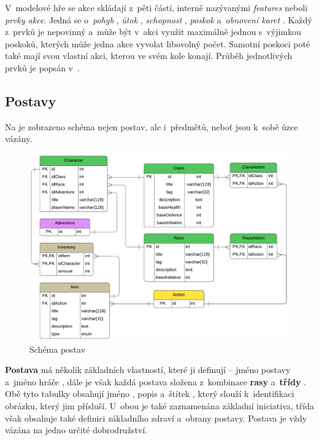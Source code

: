 V~modelové hře se akce skládají z~pěti částí, interně nazývanými \textit{features} neboli \textit{prvky akce}. Jedná se o~\textit{pohyb} , \textit{útok} , \textit{schopnost} , \textit{poskok}  a~\textit{obnovení karet} . Každý z~prvků je nepovinný a~může být v~akci využit maximálně jednou s~výjimkou poskoků, kterých může jedna akce vyvolat libovolný počet. Samotní poskoci poté také mají svou vlastní akci, kterou ve svém kole konají. Průběh jednotlivých prvků je popsán v~.


\subsection{Postavy}
\label{subsec:schema_character}

Na  je zobrazeno schéma nejen postav, ale i~předmětů, neboť jsou k~sobě úzce vázány. 

\begin{figure}[h]
    \centering
    \includegraphics[width=\textwidth]{../../shared/diagrams/er_character.pdf}
    \caption{Schéma postav}
    \label{diag:er_character}
\end{figure}

\textbf{Postava}  má několik základních vlastností, které ji definují -- jméno postavy  a~jméno hráče , dále je však každá postava složena z~kombinace \textbf{rasy}  a~\textbf{třídy} . Obě tyto tabulky obsahují jméno , popis  a~štítek , který slouží k~identifikaci obrázku, který jim přísluší. U~obou je také zaznamenána základní iniciativa, třída však obsahuje také definici základního zdraví a~obrany postavy. Postava je vždy vázána na jedno určité dobrodružství.


